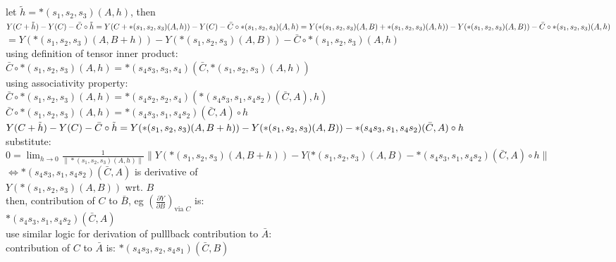\documentclass[8pt]{extarticle}
\begin{document}
\begin{multicols*}{2}
  let $\tilde{h} = *(s_1, s_2, s_3)(A, h)$, then\\
  $Y(C+\tilde{h}) - Y(C) - \bar{C} \circ \tilde{h}\\
  = Y(C+*(s_1, s_2, s_3)(A,h)) - Y(C) - \bar{C} \circ *(s_1, s_2, s_3)(A,h)\\
  = Y(*(s_1,s_2,s_3)(A,B) + *(s_1, s_2, s_3)(A,h)) - Y(*(s_1,s_2,s_3)(A,B)) - \bar{C} \circ *(s_1, s_2, s_3)(A,h)$\\
  $= Y(*(s_1,s_2,s_3)(A,B+h)) - Y(*(s_1,s_2,s_3)(A,B)) - \bar{C} \circ *(s_1, s_2, s_3)(A,h)$\\

  using definition of tensor inner product:\\
  $\bar{C} \circ *(s_1, s_2, s_3)(A,h) = *(s_4 s_3, s_3, s_4)(\bar{C}, *(s_1, s_2, s_3)(A,h))$\\

  using associativity property:\\
  $\bar{C} \circ *(s_1, s_2, s_3)(A,h) = *(s_4 s_2, s_2, s_4)(*(s_4 s_3, s_1, s_4 s_2)(\bar{C}, A), h)$\\
  $\bar{C} \circ *(s_1, s_2, s_3)(A,h) = *(s_4 s_3, s_1, s_4 s_2)(\bar{C}, A) \circ h$\\

  $Y(C+\tilde{h}) - Y(C) - \bar{C} \circ \tilde{h}\\
  = Y(*(s_1,s_2,s_3)(A,B+h)) - Y(*(s_1,s_2,s_3)(A,B))\\
  - *(s_4 s_3, s_1, s_4 s_2)(\bar{C}, A) \circ h$\\

  substitute:\\
  $0=\lim_{h\rightarrow 0} \frac{1}{\|*(s_1, s_2, s_3)(A,h)\|} \|Y(*(s_1, s_2,s _3)(A,B+h)) - Y(*(s_1,s_2,s_3)(A,B) - *(s_4 s_3, s_1, s_4 s_2)(\bar{C}, A) \circ h\|$\\
  $\iff *(s_4 s_3, s_1, s_4 s_2)(\bar{C}, A)$ is derivative of\\ $Y(*(s_1, s_2, s_3)(A, B))$ wrt. $B$\\
  then, contribution of $C$ to $\bar{B}$, eg $(\frac{\partial Y}{\partial B})_{\text{via } C}$ is:\\ $*(s_4 s_3, s_1, s_4 s_2)(\bar{C}, A)$\\

  use similar logic for derivation of pulllback contribution to $\bar{A}$:\\
  contribution of $C$ to $\bar{A}$ is: $*(s_4 s_3, s_2, s_4 s_1)(\bar{C}, B)$

  \vfill\null
  \pagebreak
    
\end{multicols*}
\end{document}
